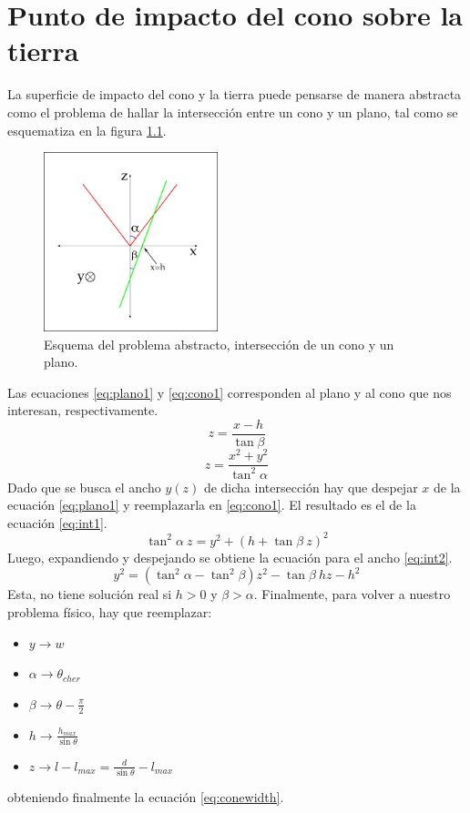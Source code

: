 \chapter{Punto de impacto del cono \cher{} sobre la tierra}
\label{ap:intPlanCon}

	La superficie de impacto del cono \cher{} y la tierra puede pensarse de manera abstracta como el problema de hallar la intersección entre un cono y un plano, tal como se esquematiza en la figura \ref{fig:conoInt}.
	\begin{figure}[ht!]
		\centering
		\includegraphics[width=0.45\textwidth]{./fig/appendix/conoInt}
		\caption{\label{fig:conoInt}
		Esquema del problema abstracto, intersección de un cono y un plano.
		}
	\end{figure}
	Las ecuaciones \ref{eq:plano1} y \ref{eq:cono1} corresponden al plano y al cono que nos interesan, respectivamente.
	\begin{equation}
	z=\frac{x-h}{\tan \beta}
	\label{eq:plano1}
	\end{equation}
	\begin{equation}
	z=\frac{x^2+y^2}{\tan^2 \alpha}
	\label{eq:cono1}
	\end{equation}
	Dado que se busca el ancho $y(z)$ de dicha intersección hay que despejar $x$ de la ecuación \ref{eq:plano1} y reemplazarla en \ref{eq:cono1}. 
	El resultado es el de la ecuación \ref{eq:int1}.
	\begin{equation}
	\tan^2\alpha\ z=y^2+(h+\tan \beta\ z)^2
	\label{eq:int1}
	\end{equation}
	Luego, expandiendo y despejando se obtiene la ecuación para el ancho \ref{eq:int2}. 
	\begin{equation}
	y^2=(\tan^2 \alpha-\tan^2 \beta) z^2 - \tan\beta\ h z - h^2
	\label{eq:int2}
	\end{equation}
	Esta, no tiene solución real si $h>0$ y $\beta>\alpha$.
	Finalmente, para volver a nuestro problema físico, hay que reemplazar:
	\begin{itemize}
	\item $y \rightarrow w$
	 \item $\alpha \rightarrow \theta_{cher}$
	 \item $\beta \rightarrow \theta - \frac{\pi}{2}$
	 \item $h \rightarrow \frac{h_{max}}{\sin{\theta}}$
	 \item $z \rightarrow l-l_{max} = \frac{d}{\sin \theta} -l_{max}$
	\end{itemize}
	obteniendo finalmente la ecuación \ref{eq:conewidth}.
